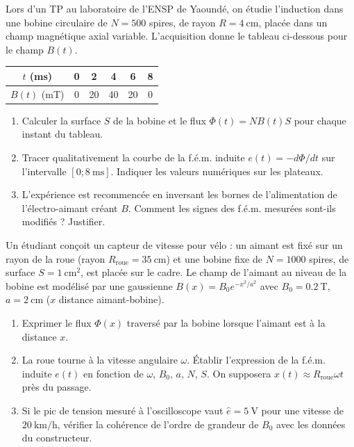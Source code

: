 \documentclass[11pt]{article}
\begin{document}
\begin{exercice}
Lors d'un TP au laboratoire de l'ENSP de Yaoundé, on étudie l'induction dans une bobine circulaire de $N = 500$ spires, de rayon $R = \SI{4}{\centi\metre}$, placée dans un champ magnétique axial variable. L'acquisition donne le tableau ci-dessous pour le champ $B(t)$.
\begin{center}
\begin{tabular}{|c|c|c|c|c|c|}
\hline
$t$ (\si{\milli\second}) & 0 & 2 & 4 & 6 & 8 \\
\hline
$B(t)$ (\si{\milli\tesla}) & 0 & 20 & 40 & 20 & 0 \\
\hline
\end{tabular}
\end{center}
\begin{enumerate}
    \item Calculer la surface $S$ de la bobine et le flux $\Phi(t) = N B(t) S$ pour chaque instant du tableau.
    \item Tracer qualitativement la courbe de la f.é.m. induite $e(t) = -d\Phi/dt$ sur l'intervalle $[0; 8~\si{\milli\second}]$. Indiquer les valeurs numériques sur les plateaux.
    \item L'expérience est recommencée en inversant les bornes de l'alimentation de l'électro-aimant créant $B$. Comment les signes des f.é.m. mesurées sont-ils modifiés ? Justifier.
\end{enumerate}
\end{exercice}

\begin{exercice}
Un étudiant conçoit un capteur de vitesse pour vélo : un aimant est fixé sur un rayon de la roue (rayon $R_{\text{roue}} = \SI{35}{\centi\metre}$) et une bobine fixe de $N = 1000$ spires, de surface $S = \SI{1}{\centi\metre\squared}$, est placée sur le cadre. Le champ de l'aimant au niveau de la bobine est modélisé par une gaussienne $B(x) = B_0 e^{-x^2/a^2}$ avec $B_0 = \SI{0,2}{\tesla}$, $a = \SI{2}{\centi\metre}$ ($x$ distance aimant-bobine).
\begin{enumerate}
    \item Exprimer le flux $\Phi(x)$ traversé par la bobine lorsque l'aimant est à la distance $x$.
    \item La roue tourne à la vitesse angulaire $\omega$. Établir l'expression de la f.é.m. induite $e(t)$ en fonction de $\omega$, $B_0$, $a$, $N$, $S$. On supposera $x(t) \approx R_{\text{roue}} \omega t$ près du passage.
    \item Si le pic de tension mesuré à l'oscilloscope vaut $\hat{e} = \SI{5}{\volt}$ pour une vitesse de $\SI{20}{\kilo\metre\per\hour}$, vérifier la cohérence de l'ordre de grandeur de $B_0$ avec les données du constructeur.
\end{enumerate}
\end{exercice}
\end{document}
